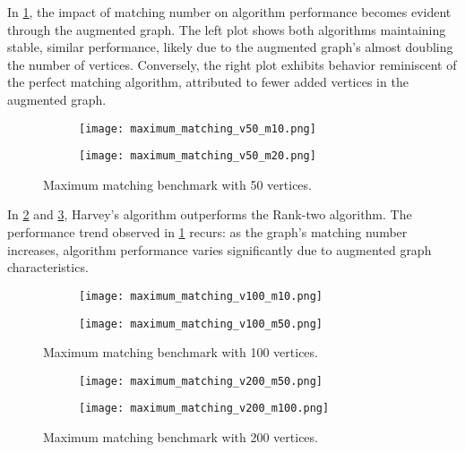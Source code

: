 In \cref{fig:maxv50}, the impact of matching number on algorithm performance becomes evident through the augmented graph.
The left plot shows both algorithms maintaining stable, similar performance, likely due to the augmented graph's almost doubling the number of vertices.
Conversely, the right plot exhibits behavior reminiscent of the perfect matching algorithm, attributed to fewer added vertices in the augmented graph.

\begin{figure}[H]
  \centering
  \begin{subfigure}{.5\textwidth}
    \centering
    \texttt{[image: maximum\_matching\_v50\_m10.png]}
  \end{subfigure}%
  \begin{subfigure}{.5\textwidth}
    \centering
    \texttt{[image: maximum\_matching\_v50\_m20.png]}
  \end{subfigure}
  \caption{Maximum matching benchmark with 50 vertices.}
  \label{fig:maxv50}
\end{figure}


In \cref{fig:maxv100} and \cref{fig:maxv200}, Harvey's algorithm outperforms the Rank-two algorithm.
The performance trend observed in \cref{fig:maxv50} recurs: as the graph's matching number increases, algorithm performance varies significantly due to augmented graph characteristics.

\begin{figure}[h]
  \centering
  \begin{subfigure}{.5\textwidth}
    \centering
    \texttt{[image: maximum\_matching\_v100\_m10.png]}
  \end{subfigure}%
  \begin{subfigure}{.5\textwidth}
    \centering
    \texttt{[image: maximum\_matching\_v100\_m50.png]}
  \end{subfigure}
  \caption{Maximum matching benchmark with 100 vertices.}
  \label{fig:maxv100}
\end{figure}

\begin{figure}[h]
  \centering
  \begin{subfigure}{.5\textwidth}
    \centering
    \texttt{[image: maximum\_matching\_v200\_m50.png]}
  \end{subfigure}%
  \begin{subfigure}{.5\textwidth}
    \centering
    \texttt{[image: maximum\_matching\_v200\_m100.png]}
  \end{subfigure}
  \caption{Maximum matching benchmark with 200 vertices.}
  \label{fig:maxv200}
\end{figure}

